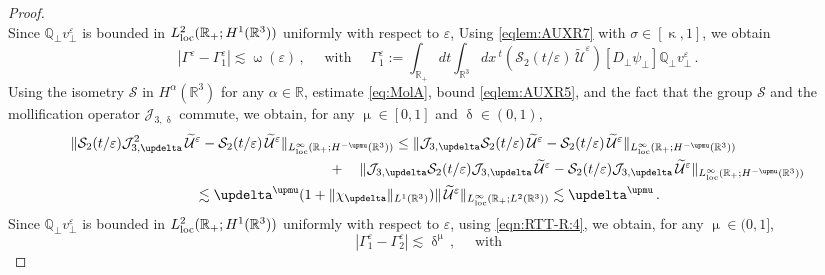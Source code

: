 \documentclass[11pt,reqno]{amsart}
\def \R{{\mathbb{R}}}
\def \Q{{\mathbb{Q}}}
\begin{document}
\begin{proof}
\begin{equation}
  \end{equation}
  Since $\Q_\perp v_\perp^\varepsilon$ is bounded in $L_{\rm loc}^2(\R_+;H^1(\R^3))$  uniformly with respect to $\varepsilon$, Using \eqref{eqlem:AUXR7} with $\sigma\in [\upkappa,1]$, we obtain
  \begin{equation}
    \label{eqn:RTT-R:3}
    |\Gamma^\varepsilon -\Gamma_1^\varepsilon| \lesssim \upomega(\varepsilon)\,, 
    \quad \mbox{ with } \quad
    \Gamma_1^\varepsilon:=  \int_{\R_+} dt \int_{\R^3}dx\,{}^t(\mathcal S_2(t/\varepsilon)\, \widetilde{\mathcal U}^\varepsilon) 
          [D_\perp \psi_\perp]  \Q_\perp v_\perp^\varepsilon\,.
  \end{equation}   
  Using the isometry $\mathcal S $ in $H^\alpha(\R^3)$ for any $ \alpha\in \R$, estimate \eqref{eq:MolA}, bound \eqref{eqlem:AUXR5}, and the fact that the group $\mathcal S$ and the mollification operator $\mathcal J_{3,\updelta}$ commute, we obtain, for any $\upmu \in [0,1]$ and $\updelta \in (0,1)$, 
  \begin{align}
    \| \mathcal S_2(t/\varepsilon) \mathcal J_{3,\updelta}^2 \,\widetilde{\mathcal U}^\varepsilon -
    \mathcal S_2(t/\varepsilon) \,\widetilde{\mathcal U}^\varepsilon \|_{L_{\rm loc}^\infty(\R_+;H^{-\upmu}(\R^3))} &\leq
    \| \mathcal  J_{3,\updelta} \mathcal S_2(t/\varepsilon)  \,\widetilde{\mathcal U}^\varepsilon -
    \mathcal S_2(t/\varepsilon) \,\widetilde{\mathcal U}^\varepsilon \|_{L_{\rm loc}^\infty(\R_+;H^{-\upmu}(\R^3))}  \nonumber \\
    & \hspace{-2.cm }\quad + \quad \|  \mathcal J_{3,\updelta} \mathcal S_2(t/\varepsilon) \mathcal J_{3,\updelta} \,\widetilde{\mathcal U}^\varepsilon -
    \mathcal S_2(t/\varepsilon) \mathcal J_{3,\updelta} \,\widetilde{\mathcal U}^\varepsilon \|_{L_{\rm loc}^\infty(\R_+;H^{-\upmu}(\R^3))} 
    \nonumber \\
    &\hspace{-5cm } \lesssim  \updelta^{\upmu}(1+\| \chi_\updelta\|_{L^1(\R^3)})\| \,\widetilde{\mathcal U}^\varepsilon \|_{L_{\rm loc}^\infty(\R_+;L^2(\R^3))}
    \lesssim  \updelta^{\upmu}\,. \label{eqn:RTT-R:4}
  \end{align}
  Since $\Q_\perp v_\perp^\varepsilon$ is bounded in $L_{\rm loc}^2(\R_+;H^1(\R^3))$  uniformly with respect to $\varepsilon$,  using \eqref{eqn:RTT-R:4}, we obtain, for any $\upmu \in (0,1]$,
  \begin{equation}
    \label{eqn:RTT-R:5}
    |\Gamma_1^\varepsilon- \Gamma_2^\varepsilon| \lesssim \updelta^\upmu\,, \quad \mbox{ with } \quad

\end{equation}
\end{proof}
\end{document}
